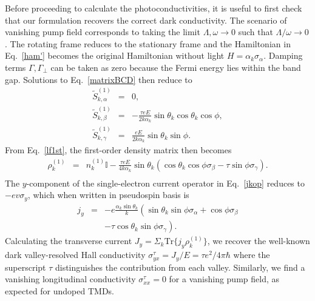 \documentclass[reprint,amsmath,amssymb,aps,prb]{revtex4-1}
\begin{document}
Before proceeding to calculate the photoconductivities, it is useful to first check that our formulation recovers the correct dark conductivity. The scenario of vanishing pump field corresponds to taking the limit $\Lambda,\omega \to 0$ such that $\Lambda/\omega \to 0$. The rotating frame reduces to the stationary frame and the Hamiltonian in Eq.~\eqref{ham'} becomes the original Hamiltonian without light  $H=\alpha_k\sigma_\alpha$. Damping terms $\Gamma, \Gamma_{\perp} $ can be taken as zero because the Fermi energy lies within the band gap. Solutions to Eq.~\eqref{matrixBCD} then reduce to   
%
\begin{eqnarray}
\tilde{S}_{k,\alpha}^{(1)}&=&0, \\
\tilde{S}_{k,\beta}^{(1)}&=&-\frac{\tau eE}{2k\alpha_k}\sin\theta_k\cos\theta_k\cos\phi, \\
\tilde{S}_{k,\gamma}^{(1)}&=&\frac{eE}{2k\alpha_k}\sin\theta_k\sin\phi.
\end{eqnarray}
%
From Eq.~\eqref{lf1st}, the first-order density matrix then becomes 
%
\begin{eqnarray}
\rho_k^{(1)}&=&n_k^{(1)}\mathbb{I}-\frac{\tau eE}{4k\alpha_k}\sin\theta_k\left(\cos\theta_k\cos\phi \sigma_\beta-\tau\sin\phi\sigma_\gamma\right). \nonumber \\
\label{rhok1}
\end{eqnarray}
%
The $y$-component of the single-electron current operator in Eq.~\eqref{jkop} reduces to $-ev\sigma_y$, which when written in pseudospin basis is  
%
\begin{eqnarray}
j_y&=&-e\frac{\alpha_k\sin\theta_k}{k}\left(\sin\theta_k\sin\phi \sigma_\alpha+\cos\phi\sigma_\beta \right. \nonumber \\
&&\left.-\tau\cos\theta_k\sin\phi \sigma_\gamma\right). \label{jy0}
\end{eqnarray}
%
Calculating the transverse current $J_y=\Sigma_k \mathrm{Tr}\{j_y \rho_k^{(1)}\}$, we recover the well-known dark valley-resolved Hall conductivity $\sigma_{yx}^{\tau} = {J_y}/{E} = {\tau e^2}/{4\pi\hbar}$ 
where the superscript $\tau$ distinguishes the contribution from each valley. 
Similarly, we find a vanishing longitudinal conductivity $\sigma_{xx}^\tau = 0$ for a vanishing pump field, as expected for undoped TMDs.
\end{document}
